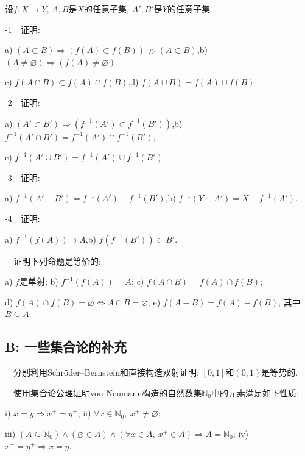 设$f:X \to Y$, $A,B$是$X$的任意子集, $A',B'$是$Y$的任意子集. 
\vspace{1em}

-1~~证明: 
\begin{center}
	a) $(A \subset B) \Rightarrow (f(A) \subset f(B)) \nRightarrow (A \subset B)$,\qquad b) $(A \neq \varnothing) \Rightarrow (f(A) \neq \varnothing)$,
	
	c) $f(A \cap B) \subset f(A) \cap f(B)$,\qquad d) $f(A \cup B) = f(A) \cup f(B)$.
\end{center}

-2~~证明: 
\begin{center}
	a) $(A' \subset B') \Rightarrow (f^{-1}(A') \subset f^{-1}(B'))$,\qquad b) $f^{-1}(A' \cap B') = f^{-1}(A') \cap f^{-1}(B')$,
	
	c) $f^{-1}(A' \cup B') = f^{-1}(A') \cup f^{-1}(B')$.
\end{center}
	
-3~~证明: 
\begin{center}
	a) $f^{-1}(A'-B') = f^{-1}(A') - f^{-1}(B')$,\qquad b) $f^{-1}(Y-A') = X-f^{-1}(A')$.
\end{center} 

-4~~证明: 
\begin{center}
	a) $f^{-1}(f(A)) \supset A$,\qquad b) $f(f^{-1}(B')) \subset B'$.
\end{center} 
\vspace{1em}

~~证明下列命题是等价的: 

\begin{center}
	a) $f$是单射; \qquad b) $f^{-1}(f(A))=A$; \qquad c) $f(A \cap B) = f(A) \cap f(B)$;
	
	d) $f(A) \cap f(B) = \varnothing \Leftrightarrow A \cap B = \varnothing$; \qquad e) $f(A-B) = f(A) - f(B)$, 其中$B \subseteq A$. 
\end{center}
\vspace{1em}

\subsection*{B: 一些集合论的补充}

~~分别利用Schröder–Bernstein和直接构造双射证明: $[0,1]$和$(0,1)$是等势的. 
\vspace{1em}


~~使用集合论公理证明von Neumann构造的自然数集$\mathbb{N}_0$中的元素满足如下性质: 
	\begin{center}
		i) $x=y \Rightarrow x^+ = y^+$; \qquad ii) $\forall x \in \mathbb{N}_0,~x^+ \neq \varnothing$;
	
		iii) $(A \subseteq \mathbb{N}_0) \wedge (\varnothing \in A) \wedge (\forall x \in A,~x^+ \in A) \Rightarrow A=\mathbb{N}_0$; \qquad iv) $x^+=y^+ \Rightarrow x=y$.
	\end{center}


